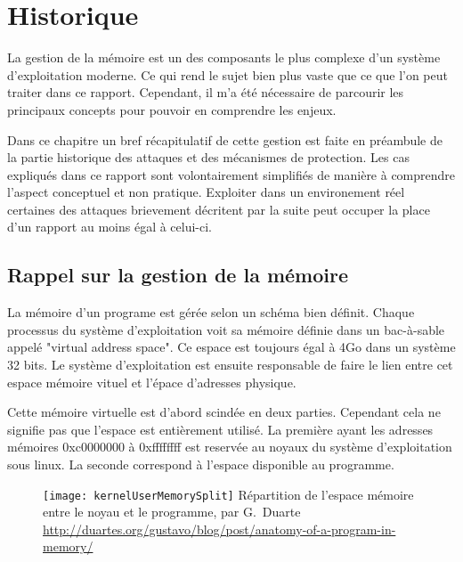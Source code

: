 \chapter{Historique}
\label{chap:historique}

La gestion de la mémoire est un des composants le plus complexe d'un système d'exploitation moderne. Ce qui rend le sujet bien plus vaste que ce que l'on peut traiter dans ce rapport. Cependant, il m'a été nécessaire de parcourir les principaux concepts pour pouvoir en comprendre les enjeux.

Dans ce chapitre un bref récapitulatif de cette gestion est faite en préambule de la partie historique des attaques et des mécanismes de protection. Les cas expliqués dans ce rapport sont volontairement simplifiés de manière à comprendre l'aspect conceptuel et non pratique. Exploiter dans un environement réel certaines des attaques brievement décritent par la suite peut occuper la place d'un rapport au moins égal à celui-ci.

\minitoc

\newpage

\section{Rappel sur la gestion de la mémoire}

La mémoire d'un programe est gérée selon un schéma bien définit. Chaque processus du système d'exploitation voit sa mémoire définie dans un bac-à-sable appelé "virtual address space". Ce espace est toujours égal à 4Go dans un système 32 bits. Le système d'exploitation est ensuite responsable de faire le lien entre cet espace mémoire vituel et l'épace d'adresses physique.

Cette mémoire virtuelle est d'abord scindée en deux parties. Cependant cela ne signifie pas que l'espace est entièrement utilisé. La première ayant les adresses mémoires 0xc0000000 à 0xffffffff est reservée au noyaux du système d'exploitation sous linux. La seconde correspond à l'espace disponible au programme.

\begin{figure}[H]
	\texttt{[image: kernelUserMemorySplit]}
	{Répartition de l'espace mémoire entre le noyau et le programme, par G.~Duarte}
	{\url{http://duartes.org/gustavo/blog/post/anatomy-of-a-program-in-memory/}}
	\label{fig:kernelUserMemorySplit}
\end{figure}


